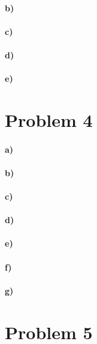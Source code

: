 \documentclass[12pt]{article}
\begin{document}
\paragraph{b)}

\paragraph{c)}

\paragraph{d)}

\paragraph{e)}

\section*{Problem 4}

\paragraph{a)}

\paragraph{b)}

\paragraph{c)}

\paragraph{d)}

\paragraph{e)}

\paragraph{f)}

\paragraph{g)}

\section*{Problem 5}
\end{document}
